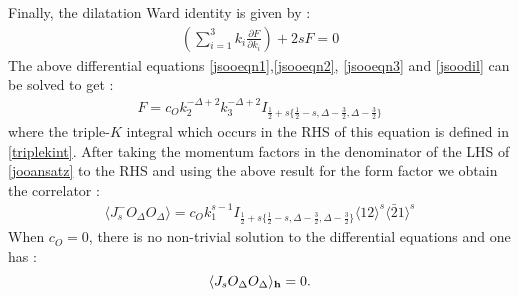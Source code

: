 \documentclass[a4paper,11pt]{article}
\begin{document}
Finally, the dilatation Ward identity is given by :
\begin{align}\label{jsoodil}
\left(\sum_{i=1}^3 k_i \frac{\partial {F}}{\partial k_i}\right)+2s{F}=0
\end{align}
The above differential equations \eqref{jsooeqn1},\eqref{jsooeqn2}, \eqref{jsooeqn3} and \eqref{jsoodil} can be solved to get :
\begin{align}
 F =  c_O k_2^{-\Delta+2}k_3^{-\Delta+2} I_{\frac{1}{2}+s\{\frac{1}{2}-s,\Delta-\frac{3}{2},\Delta-\frac{3}{2}\}}
\end{align}
where the triple-$K$ integral \cite{Bzowski:2013sza} which occurs in the RHS of this equation is defined in \eqref{triplekint}. After taking the momentum factors in the denominator of the LHS of \eqref{jooansatz} to the RHS and using the above result for the form factor we obtain the correlator :
\begin{align}\label{Jsoofnl}
\langle J_s^- O_{\Delta}O_{\Delta} \rangle= c_O k_1^{s-1} I_{\frac{1}{2}+s\{\frac{1}{2}-s,\Delta-\frac{3}{2},\Delta-\frac{3}{2}\}}\langle 12 \rangle^s \langle\bar{2}1\rangle^s
\end{align}
When $c_O=0$, there is no non-trivial solution to the differential equations and one has :
\begin{equation}
    \langle J_sO_{\Delta}O_{\Delta} \rangle _{{\bf{h}}} =0.
\end{equation}


\end{document}
